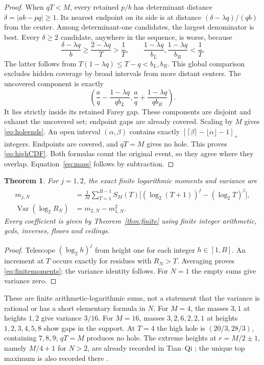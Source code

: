 \documentclass[11pt,a4paper]{article}
\numberwithin{equation}{section}
\newtheorem{theorem}{Theorem}[section]
\theoremstyle{remark}
\begin{document}
\begin{proof}
When $qT<M$, every retained $p/b$ has determinant distance
$\delta=|ab-pq|\ge1$. Its nearest endpoint on its side is at distance
$(\delta-\lambda q)/(qb)$ from the center. Among determinant-one
candidates, the largest denominator is best. Every $\delta\ge2$
candidate, anywhere in the sequence, is worse, because
\[
\frac{\delta-\lambda q}{b}\ge\frac{2-\lambda q}{T}>\frac1T,
\qquad \frac{1-\lambda q}{b_L},\frac{1-\lambda q}{b_R}<\frac1T.
\]
The latter follows from $T(1-\lambda q)\le T-q<b_L,b_R$.
This global comparison excludes hidden coverage by broad intervals
from more distant centers. The uncovered component is exactly
\[
\left(\frac aq-\frac{1-\lambda q}{qb_L},
\frac aq+\frac{1-\lambda q}{qb_R}\right).
\]
It lies strictly inside its retained Farey gap. These components are
disjoint and exhaust the uncovered set; endpoint gaps are already
covered. Scaling by $M$ gives \eqref{eq:holeends}. An open interval
$(\alpha,\beta)$ contains exactly
$[\lceil\beta\rceil-\lfloor\alpha\rfloor-1]_+$ integers. Endpoints are
covered, and $qT=M$ gives no hole. This proves \eqref{eq:highCDF}.
Both formulas count the original event, so they agree where they
overlap. Equation~\eqref{eq:mass} follows by subtraction.
\end{proof}

\begin{theorem}\label{thm:finitevariance}
For $j=1,2$, the exact finite logarithmic moments and variance are
\begin{align}
m_{j,N}&=\frac1M\sum_{T=1}^{B-1}S_M(T)
\big[(\log_2(T+1))^j-(\log_2T)^j\big],\label{eq:finitemoments}\\
\operatorname{Var}(\log_2R_N)&=m_{2,N}-m_{1,N}^2.\label{eq:finitevariance}
\end{align}
Every coefficient is given by Theorem~\ref{thm:finite} using finite
integer arithmetic, gcds, inverses, floors and ceilings.
\end{theorem}
\begin{proof}
Telescope $(\log_2h)^j$ from height one for each integer $h\in[1,B]$.
An increment at $T$ occurs exactly for residues with $R_N>T$.
Averaging proves \eqref{eq:finitemoments}; the variance identity follows.
For $N=1$ the empty sums give variance zero.
\end{proof}
These are finite arithmetic-logarithmic sums, not a statement that the
variance is rational or has a short elementary formula in $N$.
For $M=4$, the masses $3,1$ at heights $1,2$ give variance $3/16$.
For $M=16$, masses $3,2,6,2,2,1$ at heights $1,2,3,4,5,8$ show
gaps in the support. At $T=4$ the high hole is $(20/3,28/3)$,
containing $7,8,9$; $qT=M$ produces no hole. The extreme heights
at $r=M/2\pm1$, namely $M/4+1$ for $N>2$, are already recorded in
Tian--Qi \cite[Lemma~8, p.~74]{TQ}; the unique top maximum is also
recorded there \cite[Lemma~10, p.~77]{TQ}.
\end{document}
